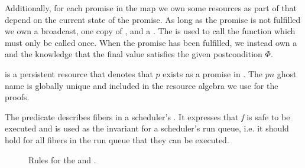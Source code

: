 Additionally, for each promise in the map we own some resources as part of \gsPInvIn{} that depend on the current state of the promise.
As long as the promise is not fulfilled we own a broadcast, one copy of \gspwait{}, and a \gssignal{}.
The \gssignal{} is used to call the  function which must only be called once.
When the promise has been fulfilled, we instead own a \gspdone{} and the knowledge that the final value satisfies the given postcondition \(Φ\).

\gsIsPr{} is a persistent resource that denotes that \(p\) exists as a promise in \gsPInvIn{}. The \(pn\) ghost name is globally unique and included in the resource algebra we use for the proofs.

The \gsReady{} predicate describes fibers in a scheduler's .
It expresses that \emph{f} is safe to be executed and is used as the invariant for a scheduler's run queue, i.e. it should hold for all fibers in the run queue that they can be executed.

\begin{figure}
  \caption{Rules for the \gspwait{} and \gspdone{}.}
  \label{fig:promise-state-rules}\label{spec:ps_contra}
\end{figure}

